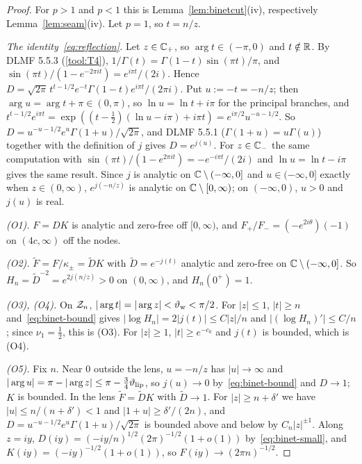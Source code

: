 \begin{proof}
For $p>1$ and $p<1$ this is Lemma~\ref{lem:binetcut}(iv), respectively Lemma~\ref{lem:seam}(iv). Let $p=1$, so $t=n/z$.

\emph{The identity~\eqref{eq:reflection}.} Let $z\in\mathbb{C}_+$, so $\arg t\in(-\pi,0)$ and $t\notin\mathbb{R}$. By DLMF 5.5.3
(\ref{tool:T4}), $1/\Gamma(t)=\Gamma(1-t)\sin(\pi t)/\pi$, and $\sin(\pi t)/(1-e^{-2\pi it})=e^{i\pi t}/(2i)$. Hence
$D=\sqrt{2\pi}\,t^{t-1/2}e^{-t}\Gamma(1-t)e^{i\pi t}/(2\pi i)$. Put $u:=-t=-n/z$; then $\arg u=\arg t+\pi\in(0,\pi)$, so
$\ln u=\ln t+i\pi$ for the principal branches, and
$t^{t-1/2}e^{i\pi t}=\exp((t-\frac12)(\ln u-i\pi)+i\pi t)=e^{i\pi/2}u^{-u-1/2}$. So $D=u^{-u-1/2}e^u\Gamma(1+u)/\sqrt{2\pi}$,
and DLMF 5.5.1 ($\Gamma(1+u)=u\Gamma(u)$) together with the definition of $j$ gives $D=e^{j(u)}$. For $z\in\mathbb{C}_-$ the same
computation with $\sin(\pi t)/(1-e^{2\pi it})=-e^{-i\pi t}/(2i)$ and $\ln u=\ln t-i\pi$ gives the same result. Since $j$ is
analytic on $\mathbb{C}\setminus(-\infty,0]$ and $u\in(-\infty,0]$ exactly when $z\in(0,\infty)$, $e^{j(-n/z)}$ is analytic on
$\mathbb{C}\setminus[0,\infty)$; on $(-\infty,0)$, $u>0$ and $j(u)$ is real.

\emph{(O1).} $F=DK$ is analytic and zero-free off $[0,\infty)$, and $F_+/F_-=(-e^{2i\theta})(-1)$ on $(4c,\infty)$ off the
nodes.

\emph{(O2).} $\tilde F=F/\kappa_\pm=\tilde DK$ with $\tilde D=e^{-j(t)}$ analytic and zero-free on $\mathbb{C}\setminus(-\infty,0]$.
So $H_n=\tilde D^{-2}=e^{2j(n/z)}>0$ on $(0,\infty)$, and $H_n(0^+)=1$.

\emph{(O3), (O4).} On $\mathcal{Z}_n$, $|\arg t|=|\arg z|<\vartheta_{\mathrm{w}}<\pi/2$. For $|z|\le1$, $|t|\ge n$ and~\eqref{eq:binet-bound}
gives $|\log H_n|=2|j(t)|\le C|z|/n$ and $|(\log H_n)'|\le C/n$; since $\nu_1=\frac12$, this is (O3). For $|z|\ge1$,
$|t|\ge e^{-c_0}$ and $j(t)$ is bounded, which is (O4).

\emph{(O5).} Fix $n$. Near $0$ outside the lens, $u=-n/z$ has $|u|\to\infty$ and $|\arg u|=\pi-|\arg z|\le\pi-\frac34\vartheta_{\mathrm{lip}}$,
so $j(u)\to0$ by~\eqref{eq:binet-bound} and $D\to1$; $K$ is bounded. In the lens $\tilde F=\tilde DK$ with $\tilde D\to1$.
For $|z|\ge n+\delta'$ we have $|u|\le n/(n+\delta')<1$ and $|1+u|\ge\delta'/(2n)$, and
$D=u^{-u-1/2}e^u\Gamma(1+u)/\sqrt{2\pi}$ is bounded above and below by $C_n|z|^{\pm1}$. Along $z=iy$,
$D(iy)=(-iy/n)^{1/2}(2\pi)^{-1/2}(1+o(1))$ by~\eqref{eq:binet-small}, and $K(iy)=(-iy)^{-1/2}(1+o(1))$, so
$F(iy)\to(2\pi n)^{-1/2}$.
\end{proof}

